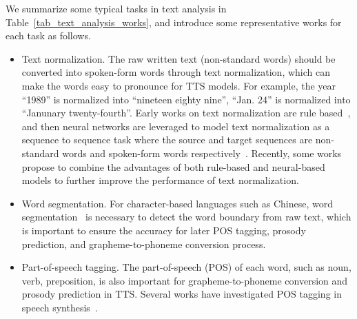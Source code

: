 \documentclass{article}
\begin{document}
We summarize some typical tasks in text analysis in Table~\ref{tab_text_analysis_works}, and introduce some representative works for each task as follows.
\begin{itemize}[leftmargin=*]
    \item Text normalization. The raw written text (non-standard words) should be converted into spoken-form words through text normalization, which can make the words easy to pronounce for TTS models. For example, the year ``1989'' is normalized into ``nineteen eighty nine'', ``Jan. 24'' is normalized into ``Janunary twenty-fourth''. Early works on text normalization are rule based~\cite{sproat2001normalization}, and then neural networks are leveraged to model text normalization as a sequence to sequence task where the source and target sequences are non-standard words and spoken-form words respectively~\cite{sproat2016rnn,mansfield2019neural,zhang2019neural}. Recently, some works~\cite{zhang2020hybrid} propose to combine the advantages of both rule-based and neural-based models to further improve the performance of text normalization. 
    \item Word segmentation. For character-based languages such as Chinese, word segmentation~\cite{xue2003chinese,zheng2013deep,pei2014max} is necessary to detect the word boundary from raw text, which is important to ensure the accuracy for later POS tagging, prosody prediction, and grapheme-to-phoneme conversion process. 
    \item Part-of-speech tagging. The part-of-speech (POS) of each word, such as noun, verb, preposition, is also important for grapheme-to-phoneme conversion and prosody prediction in TTS. Several works have investigated POS tagging in speech synthesis~\cite{schlunz2010effects,sun2011improved,mamateli2011morphological,zheng2013deep,janicki2004application}. 

\end{itemize}
\end{document}
